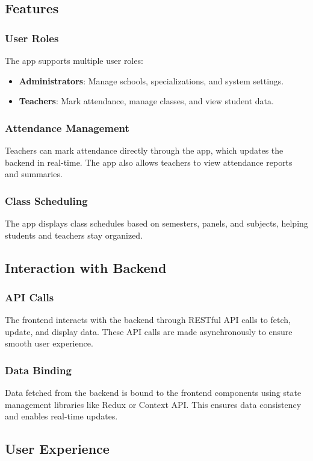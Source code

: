 \documentclass[conference]{IEEEtran}
\begin{document}
\subsection{Features}
\subsubsection{User Roles}
The app supports multiple user roles:
\begin{itemize}
    \item \textbf{Administrators}: Manage schools, specializations, and system settings.
    \item \textbf{Teachers}: Mark attendance, manage classes, and view student data.
\end{itemize}

\subsubsection{Attendance Management}
Teachers can mark attendance directly through the app, which updates the backend in real-time. The app also allows teachers to view attendance reports and summaries.

\subsubsection{Class Scheduling}
The app displays class schedules based on semesters, panels, and subjects, helping students and teachers stay organized.

\subsection{Interaction with Backend}
\subsubsection{API Calls}
The frontend interacts with the backend through RESTful API calls to fetch, update, and display data. These API calls are made asynchronously to ensure smooth user experience.

\subsubsection{Data Binding}
Data fetched from the backend is bound to the frontend components using state management libraries like Redux or Context API. This ensures data consistency and enables real-time updates.

\subsection{User Experience}
\end{document}
